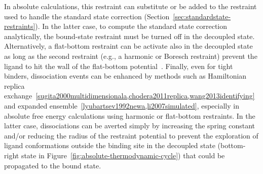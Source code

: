 \documentclass[9pt,bestpractices]{livecoms}
\begin{document}
In absolute calculations, this restraint can substitute or be added to the restraint used to handle the standard state correction (Section~\ref{sec:standardstate-restraints}).
In the latter case, to compute the standard state correction analytically, the bound-state restraint must be turned off in the decoupled state.
Alternatively, a flat-bottom restraint can be activate also in the decoupled state as long as the second restraint (e.g., a harmonic or Boresch restraint) prevent the ligand to hit the wall of the flat-bottom potential~\cite{rizzi2019sampl6}.
Finally, even for tight binders, dissociation events can be enhanced by methods such as Hamiltonian replica exchange~\ref{sugita2000multidimensionala,chodera2011replica,wang2013identifying} and expanded ensemble~\ref{lyubartsev1992newa,li2007simulated}, especially in absolute free energy calculations using harmonic or flat-bottom restraints.
In the latter case, dissociations can be averted simply by increasing the spring constant and/or reducing the radius of the restraint potential to prevent the exploration of ligand conformations outside the binding site in the decoupled state (bottom-right state in Figure~\ref{fig:absolute-thermodynamic-cycle}) that could be propagated to the bound state.
%
\end{document}

